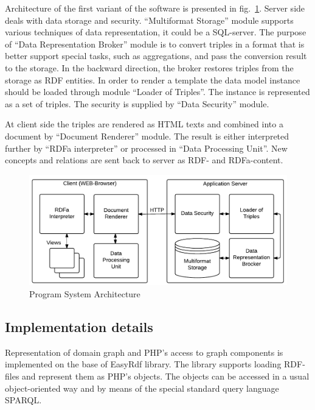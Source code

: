 \documentclass[conference]{IEEEtran}
\begin{document}
Architecture of the first variant of the software is presented in
fig.~\ref{fig:progsys}.  Server side deals with data storage and
security.  ``Multiformat Storage'' module supports various techniques
of data representation, it could be a SQL-server.  The purpose of
``Data Representation Broker'' module is to convert triples in a
format that is better support special tasks, such as aggregations, and
pass the conversion result to the storage.  In the backward direction,
the broker restores triples from the storage as RDF entities.  In
order to render a template the data model instance should be loaded
through module ``Loader of Triples''.  The instance is represented as
a set of triples.  The security is supplied by “Data Security” module.

At client side the triples are rendered as HTML texts and combined
into a document by ``Document Renderer'' module.  The result is either
interpreted further by ``RDFa interpreter'' or processed in ``Data
Processing Unit''.  New concepts and relations are sent back to server
as RDF- and RDFa-content.

\noindent\begin{figure}[!t]
\centering
\includegraphics[width=\linewidth]{peixe-architecture-en-2.pdf}
\caption{Program System Architecture}
\label{fig:progsys}
\end{figure}

\subsection{Implementation details}
\label{sec:implsoft}

Representation of domain graph and PHP's access to graph components is
implemented on the base of EasyRdf library.  The library supports
loading RDF-files and represent them as PHP's objects.  The objects
can be accessed in a usual object-oriented way and by means of the
special standard query language SPARQL.
\end{document}
